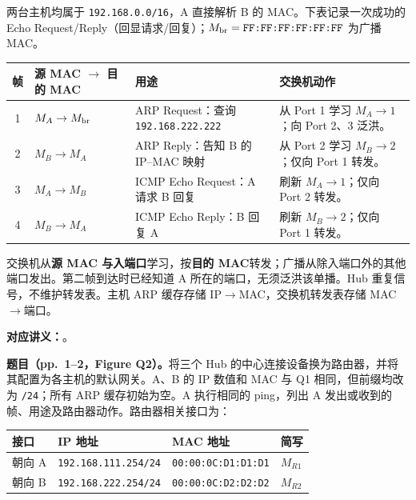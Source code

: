 \begin{checkedsolution}
两台主机均属于 \texttt{192.168.0.0/16}，A 直接解析 B 的 MAC。下表记录一次成功的 Echo Request/Reply（回显请求/回复）；$M_{\rm br}=\texttt{FF:FF:FF:FF:FF:FF}$ 为广播 MAC。

\begin{center}
\small
\begin{tabularx}{\textwidth}{@{}cl>{\raggedright\arraybackslash}p{4.6cm}X@{}}
\toprule
帧 & 源 MAC $\to$ 目的 MAC & 用途 & 交换机动作 \\
\midrule
1 & $M_A\to M_{\rm br}$ & ARP Request：查询 \texttt{192.168.222.222} & 从 Port 1 学习 $M_A\to1$；向 Port 2、3 泛洪。\\
2 & $M_B\to M_A$ & ARP Reply：告知 B 的 IP--MAC 映射 & 从 Port 2 学习 $M_B\to2$；仅向 Port 1 转发。\\
3 & $M_A\to M_B$ & ICMP Echo Request：A 请求 B 回复 & 刷新 $M_A\to1$；仅向 Port 2 转发。\\
4 & $M_B\to M_A$ & ICMP Echo Reply：B 回复 A & 刷新 $M_B\to2$；仅向 Port 1 转发。\\
\bottomrule
\end{tabularx}
\end{center}

交换机从\textbf{源 MAC 与入端口}学习，按\textbf{目的 MAC}转发；广播从除入端口外的其他端口发出。第二帧到达时已经知道 A 所在的端口，无须泛洪该单播。Hub 重复信号，不维护转发表。主机 ARP 缓存存储 IP$\to$MAC，交换机转发表存储 MAC$\to$端口。
\end{checkedsolution}

\textbf{对应讲义：}。

\textbf{题目（pp.~1--2，Figure Q2）。}将三个 Hub 的中心连接设备换为路由器，并将其配置为各主机的默认网关。A、B 的 IP 数值和 MAC 与 Q1 相同，但前缀均改为 \texttt{/24}；所有 ARP 缓存初始为空。A 执行相同的 ping，列出 A 发出或收到的帧、用途及路由器动作。路由器相关接口为：

\begin{center}
\small
\begin{tabular}{@{}llll@{}}
\toprule
接口 & IP 地址 & MAC 地址 & 简写 \\
\midrule
朝向 A & \texttt{192.168.111.254/24} & \texttt{00:00:0C:D1:D1:D1} & $M_{R1}$ \\
朝向 B & \texttt{192.168.222.254/24} & \texttt{00:00:0C:D2:D2:D2} & $M_{R2}$ \\
\bottomrule
\end{tabular}
\end{center}

